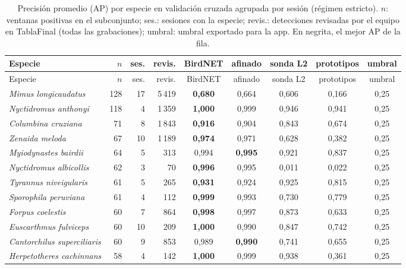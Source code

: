 \begingroup\small
\setlength{\tabcolsep}{4pt}
\begin{longtable}{lrrrccccc}
\caption{Precisión promedio (AP) por especie en validación cruzada agrupada por sesión (régimen estricto). $n$: ventanas positivas en el subconjunto; ses.: sesiones con la especie; revis.: detecciones revisadas por el equipo en TablaFinal (todas las grabaciones); umbral: umbral exportado para la app. En negrita, el mejor AP de la fila.}\label{tab:species}\\
\toprule
Especie & $n$ & ses. & revis. & BirdNET & afinado & sonda L2 & prototipos & umbral\\
\midrule
\endfirsthead
\toprule
Especie & $n$ & ses. & revis. & BirdNET & afinado & sonda L2 & prototipos & umbral\\
\midrule
\endhead
\bottomrule
\endfoot
\textit{Mimus longicaudatus} & 128 & 17 & 5\,419 & \textbf{0{,}680} & 0{,}664 & 0{,}606 & 0{,}166 & 0{,}25\\
\textit{Nyctidromus anthonyi} & 118 & 4 & 1\,359 & \textbf{1{,}000} & 0{,}999 & 0{,}946 & 0{,}941 & 0{,}25\\
\textit{Columbina cruziana} & 71 & 8 & 1\,843 & \textbf{0{,}916} & 0{,}904 & 0{,}843 & 0{,}674 & 0{,}25\\
\textit{Zenaida meloda} & 67 & 10 & 1\,189 & \textbf{0{,}974} & 0{,}971 & 0{,}628 & 0{,}382 & 0{,}25\\
\textit{Myiodynastes bairdii} & 64 & 5 & 313 & 0{,}994 & \textbf{0{,}995} & 0{,}921 & 0{,}837 & 0{,}25\\
\textit{Nyctidromus albicollis} & 62 & 3 & 70 & \textbf{0{,}996} & 0{,}995 & 0{,}011 & 0{,}022 & 0{,}25\\
\textit{Tyrannus niveigularis} & 61 & 5 & 265 & \textbf{0{,}931} & 0{,}924 & 0{,}925 & 0{,}815 & 0{,}25\\
\textit{Sporophila peruviana} & 61 & 4 & 112 & \textbf{0{,}999} & 0{,}993 & 0{,}730 & 0{,}779 & 0{,}25\\
\textit{Forpus coelestis} & 60 & 7 & 864 & \textbf{0{,}998} & 0{,}997 & 0{,}873 & 0{,}633 & 0{,}25\\
\textit{Euscarthmus fulviceps} & 60 & 10 & 209 & \textbf{1{,}000} & 0{,}990 & 0{,}847 & 0{,}742 & 0{,}25\\
\textit{Cantorchilus superciliaris} & 60 & 9 & 853 & 0{,}989 & \textbf{0{,}990} & 0{,}741 & 0{,}655 & 0{,}25\\
\textit{Herpetotheres cachinnans} & 58 & 4 & 142 & \textbf{1{,}000} & 0{,}999 & 0{,}938 & 0{,}361 & 0{,}25\\

\end{longtable}
